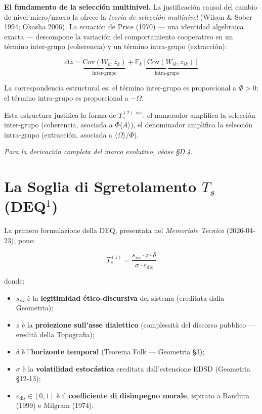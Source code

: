 \Proved{} \textbf{El fundamento de la selecci\'{o}n multinivel.} La
justificaci\'{o}n causal del cambio de nivel micro/macro la ofrece la
\textit{teor\'{i}a de selecci\'{o}n multinivel} (Wilson \& Sober 1994;
Okasha 2006). La ecuaci\'{o}n de Price (1970) --- una identidad
algebraica exacta --- descompone la variaci\'{o}n del comportamiento
cooperativo en un t\'{e}rmino inter-grupo (coherencia) y un t\'{e}rmino
intra-grupo (extracci\'{o}n):

\[
\Delta\bar{z} = \underbrace{\mathrm{Cov}(W_k,\bar{z}_k)}_{\text{inter-grupo}} + \underbrace{\mathbb{E}_k\!\left[\mathrm{Cov}(W_{ik},z_{ik})\right]}_{\text{intra-grupo}} \tag{Price 1970}
\]

\Hypoth{} La correspondencia estructural es: el t\'{e}rmino inter-grupo
es proporcional a \(\Phi > 0\); el t\'{e}rmino intra-grupo es
proporcional a \(-\Omega\).

Esta estructura justifica la forma de \(T_s^{(2),\text{sys}}\): el
numerador amplifica la selecci\'{o}n inter-grupo (coherencia, asociada a
\(\Phi\langle A\rangle\)), el denominador amplifica la selecci\'{o}n
intra-grupo (extracci\'{o}n, asociada a \(\langle\Omega\rangle/\Phi\)).

\textit{Para la derivaci\'{o}n completa del marco evolutivo, v\'{e}ase §D.4.}



\section{\texorpdfstring{La Soglia di Sgretolamento \(T_s\)
(DEQ$^1$)}{La Soglia di Sgretolamento T\_s (DEQ$^1$)}}\label{la-soglia-di-sgretolamento-t_s-dequxb9}

La primero formulazione della DEQ, presentata nel \emph{Memoriale Tecnico}
(2026-04-23), pone:

\[
T_s^{(1)} = \frac{s_{iii} \cdot z \cdot \delta}{\sigma \cdot \varepsilon_{\text{dis}}}
\]

donde:

\begin{itemize}
\tightlist
\item
  \(s_{iii}\) è la \textbf{legitimidad ético-discursiva} del sistema
  (ereditata dalla Geometria);
\item
  \(z\) è la \textbf{proiezione sull'asse dialettico} (complessità del
  discorso pubblico --- eredità della Topografia);
\item
  \(\delta\) è l'\textbf{horizonte temporal} (Teorema Folk ---
  Geometria \S{}3);
\item
  \(\sigma\) è la \textbf{volatilidad estocástica} ereditata
  dall'estensione EDSD (Geometria \S{}12-13);
\item
  \(\varepsilon_{\text{dis}} \in [0,1]\) è il \textbf{coefficiente di
  disimpegno morale}, ispirato a Bandura (1999) e Milgram (1974).
\end{itemize}

